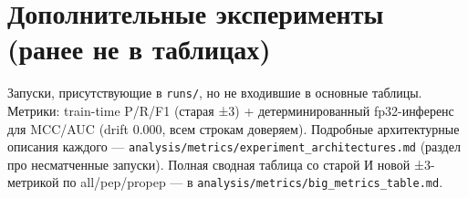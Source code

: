 \documentclass[a4paper,10pt]{article}
\begin{document}
\section*{Дополнительные эксперименты (ранее не в таблицах)}
Запуски, присутствующие в \texttt{runs/}, но не входившие в основные таблицы. Метрики:
train-time P/R/F1 (старая ±3) + детерминированный fp32-инференс для MCC/AUC (drift 0.000,
всем строкам доверяем). Подробные архитектурные описания каждого —
\texttt{analysis/metrics/experiment\_architectures.md} (раздел про несматченные запуски).
Полная сводная таблица со старой И новой ±3-метрикой по all/pep/propep — в
\texttt{analysis/metrics/big\_metrics\_table.md}.
\end{document}
